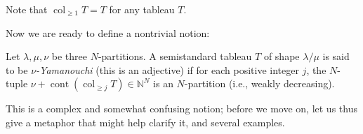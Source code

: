 Note that $\operatorname{col}_{\geq1}T=T$ for any tableau $T$.

Now we are ready to define a nontrivial notion:

\begin{definition}
\label{def.sf.yamanouchi}Let $\lambda,\mu,\nu$ be three $N$-partitions. A
semistandard tableau $T$ of shape $\lambda/\mu$ is said to be $\nu
$\emph{-Yamanouchi} (this is an adjective) if for each positive integer $j$,
the $N$-tuple $\nu+\operatorname*{cont}\left(  \operatorname{col}_{\geq
j}T\right)  \in\mathbb{N}^{N}$ is an $N$-partition (i.e., weakly decreasing).
\end{definition}

This is a complex and somewhat confusing notion; before we move on, let us
thus give a metaphor that might help clarify it, and several examples.

